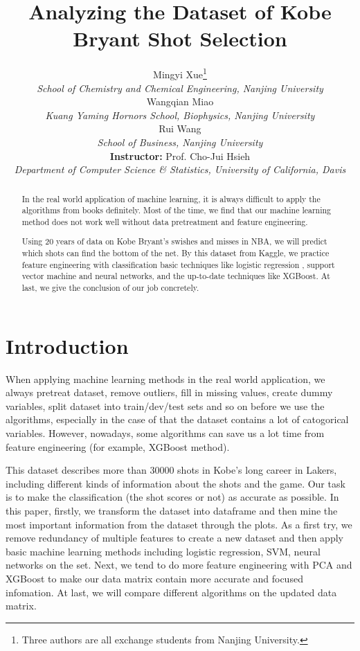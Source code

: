 \documentclass[a4paper,11pt,onecolumn,twoside]{article}
\title{\Large \textbf{Analyzing the Dataset of Kobe Bryant Shot Selection}}
\author{
Mingyi Xue\footnote{Three authors are all exchange students from Nanjing University.}\\[2pt]
{\large \textit{School of Chemistry and Chemical Engineering, Nanjing University}}\\[6pt]Wangqian Miao
\\[2pt]
{\large \textit{Kuang Yaming Hornors School, Biophysics, Nanjing University}}\\[6pt]
Rui Wang\\[2pt]
{\large \textit{School of Business, Nanjing University}}\\[6pt]
\textbf{Instructor:} Prof. Cho-Jui Hsieh\\[2pt]
{\large \textit{Department of Computer Science \& Statistics, University of California, Davis}}\\[2pt]
}
\date{}
\begin{document}
\maketitle
\thispagestyle{firststyle}
\setlength{\oddsidemargin}{ 1cm}
\setlength{\evensidemargin}{\oddsidemargin}
\setlength{\textwidth}{15.50cm}
\vspace{-.8cm}
\setcounter{page}{1}
\setlength{\oddsidemargin}{-.5cm}  %
\setlength{\evensidemargin}{\oddsidemargin}
\setlength{\textwidth}{17.00cm}

\begin{abstract}
In the real world application of machine learning, it is always difficult to apply the algorithms from books definitely. Most of the time, we find that our machine learning method does not work well without data pretreatment and feature engineering.\par 
Using 20 years of data on Kobe Bryant's swishes and misses in NBA, we will predict which shots can find the bottom of the net. By this dataset from Kaggle, we practice feature engineering with classification basic techniques like logistic regression , support vector machine and neural networks, and the up-to-date techniques like  XGBoost. At last, we give the conclusion of our job concretely.
\end{abstract}	
\section{Introduction}
When applying machine learning methods in the real world application, we always pretreat dataset, remove outliers, fill in missing values, create dummy variables, split dataset into train/dev/test sets and so on before we use the algorithms, especially in the case of that the dataset contains a lot of catogorical variables. However, nowadays, some algorithms can save us a lot time from feature engineering (for example, XGBoost method).\par
This dataset describes more than 30000 shots in Kobe's long career in Lakers, including different kinds of information about the shots and the game. Our task is to make the classification (the shot scores or not) as accurate as possible. In this paper, firstly, we transform the dataset into dataframe and then mine the most important information from the dataset through the plots. As a first try, we remove redundancy of multiple features to create a new dataset and then apply basic machine learning methods including logistic regression, SVM, neural networks on the set. Next, we tend to do more feature engineering with PCA and XGBoost to make our data matrix contain more accurate and focused infomation. At last, we will compare different algorithms on the updated data matrix.
\end{document}
